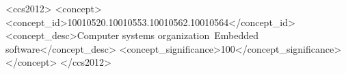 \documentclass[acmsmall]{acmart}
\begin{document}
%
%


%
\begin{CCSXML}
	<ccs2012>
	<concept>
	<concept_id>10010520.10010553.10010562.10010564</concept_id>
	<concept_desc>Computer systems organization~Embedded software</concept_desc>
	<concept_significance>100</concept_significance>
	</concept>
	</ccs2012>
\end{CCSXML}




\maketitle






%







%
\end{document}
